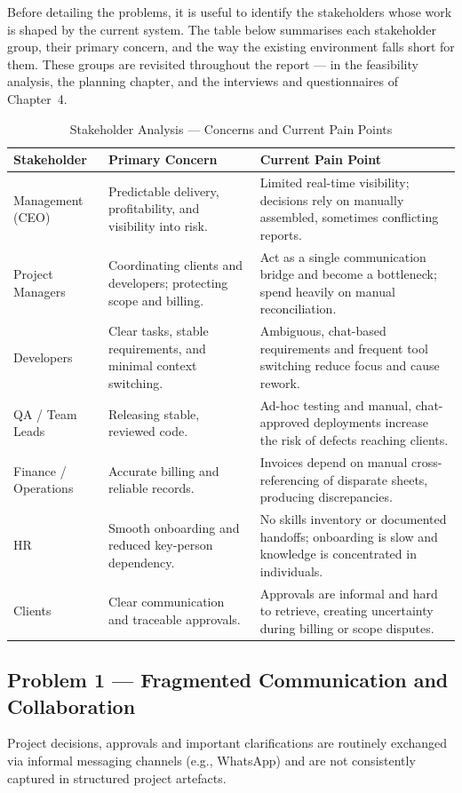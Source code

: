 \documentclass[12pt,a4paper]{report}
\begin{document}
Before detailing the problems, it is useful to identify the stakeholders whose work is shaped by the current system. The table below summarises each stakeholder group, their primary concern, and the way the existing environment falls short for them. These groups are revisited throughout the report --- in the feasibility analysis, the planning chapter, and the interviews and questionnaires of Chapter~4.

\begin{table}[H]
\centering
\renewcommand{\arraystretch}{1.35}
\small
\begin{tabularx}{\textwidth}{|p{3cm}|X|X|}
\hline
\rowcolor{secondary}
\textbf{Stakeholder} & \textbf{Primary Concern} & \textbf{Current Pain Point} \\
\hline
Management (CEO) & Predictable delivery, profitability, and visibility into risk. & Limited real-time visibility; decisions rely on manually assembled, sometimes conflicting reports. \\
\hline
Project Managers & Coordinating clients and developers; protecting scope and billing. & Act as a single communication bridge and become a bottleneck; spend heavily on manual reconciliation. \\
\hline
Developers & Clear tasks, stable requirements, and minimal context switching. & Ambiguous, chat-based requirements and frequent tool switching reduce focus and cause rework. \\
\hline
QA / Team Leads & Releasing stable, reviewed code. & Ad-hoc testing and manual, chat-approved deployments increase the risk of defects reaching clients. \\
\hline
Finance / Operations & Accurate billing and reliable records. & Invoices depend on manual cross-referencing of disparate sheets, producing discrepancies. \\
\hline
HR & Smooth onboarding and reduced key-person dependency. & No skills inventory or documented handoffs; onboarding is slow and knowledge is concentrated in individuals. \\
\hline
Clients & Clear communication and traceable approvals. & Approvals are informal and hard to retrieve, creating uncertainty during billing or scope disputes. \\
\hline
\end{tabularx}
\caption{Stakeholder Analysis --- Concerns and Current Pain Points}
\end{table}

\subsection{Problem 1 --- Fragmented Communication and Collaboration}
\begin{problemBox}
Project decisions, approvals and important clarifications are routinely exchanged via informal messaging channels (e.g., WhatsApp) and are not consistently captured in structured project artefacts.
\end{problemBox}
\end{document}
